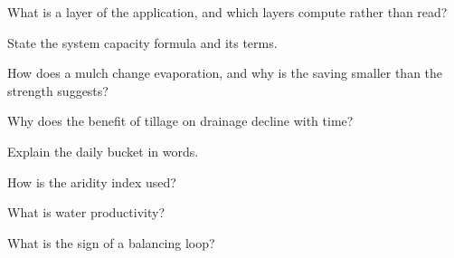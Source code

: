 \begin{exlist}
\item What is a layer of the application, and which layers compute rather than read?
\item State the system capacity formula and its terms.
\item How does a mulch change evaporation, and why is the saving smaller than the strength suggests?
\item Why does the benefit of tillage on drainage decline with time?
\item Explain the daily bucket in words.
\item How is the aridity index used?
\item What is water productivity?
\item What is the sign of a balancing loop?
\end{exlist}
